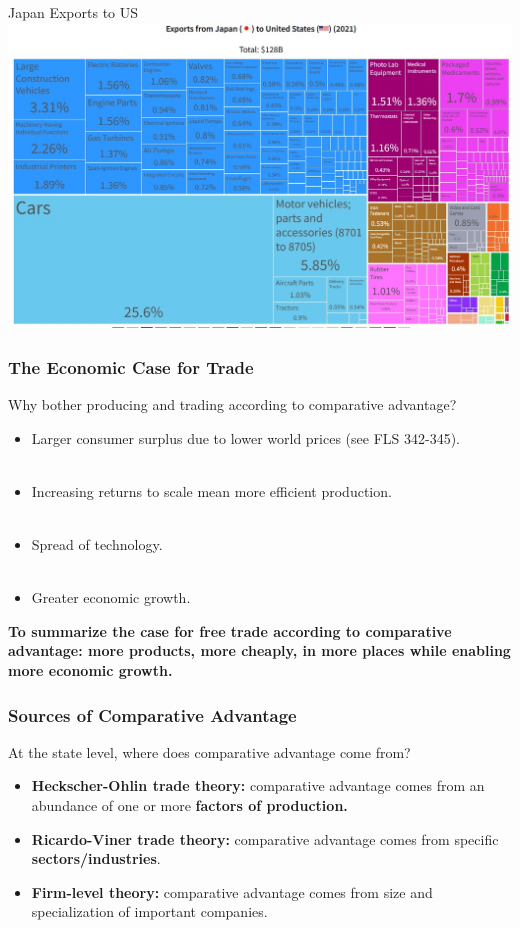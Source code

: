 \documentclass{beamer}
\begin{document}
\begin{frame}{\LARGE Japan Exports to US}
    \centering
\includegraphics[width=\textwidth,height=0.9\textheight,keepaspectratio]{Japan to US.JPG}
\end{frame}

\begin{frame} 
\frametitle{\LARGE{The Economic Case for Trade}}
Why bother producing and trading according to comparative advantage?
    \begin{itemize}
        \item Larger consumer surplus due to lower world prices (see FLS 342-345). \pause 
        \\~\\
        \item Increasing returns to scale mean more efficient production. \pause 
        \\~\\
        \item Spread of technology. \pause 
        \\~\\ 
        \item Greater economic growth. \pause
    \end{itemize}
\textbf{To summarize the case for free trade according to comparative advantage: more products, more cheaply, in more places while enabling more economic growth.}
\end{frame}

\begin{frame} 
	\frametitle{\LARGE{Sources of Comparative Advantage}}
At the state level, where does comparative advantage come from?
	\begin{itemize}
			\item \textbf{Heckscher-Ohlin trade theory:} comparative advantage comes from an abundance of one or more \textbf{factors of production.} \pause 
			\item \textbf{Ricardo-Viner trade theory:} comparative advantage comes from specific \textbf{sectors/industries}. \pause 
			\item \textbf{Firm-level theory:} comparative advantage comes from size and specialization of important companies.
	\end{itemize}
\end{frame}
\end{document}
